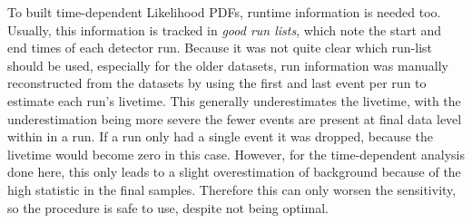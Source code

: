 To built time-dependent Likelihood PDFs, runtime information is needed too.
Usually, this information is tracked in \emph{good run lists}, which note the start and end times of each detector run.
Because it was not quite clear which run-list should be used, especially for the older datasets, run information was manually reconstructed from the datasets by using the first and last event per run to estimate each run's livetime.
This generally underestimates the livetime, with the underestimation being more severe the fewer events are present at final data level within in a run.
If a run only had a single event it was dropped, because the livetime would become zero in this case.
However, for the time-dependent analysis done here, this only leads to a slight overestimation of background because of the high statistic in the final samples.
Therefore this can only worsen the sensitivity, so the procedure is safe to use, despite not being optimal.

